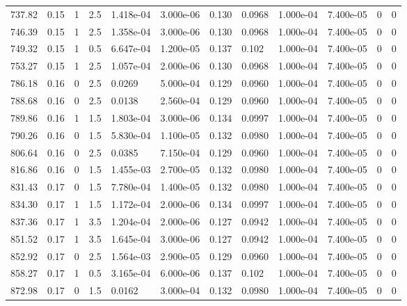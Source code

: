 \documentclass[preview]{standalone}
\begin{document}
{{{\begin{tabular}{L{1.2cm}C{1.2cm} C{0.3cm}C{0.5cm} C{1.4cm}C{1.4cm} C{1.4cm}C{1.4cm} C{1.6cm}C{1.6cm} C{1.6cm}C{1.6cm}}
  737.82  &  0.15  & 1     & 2.5 &  1.418e-04  & 3.000e-06  &  0.130&   0.0968& 1.000e-04 & 7.400e-05   &  0 & 0  \\ 
  746.39  &  0.15  & 1     & 2.5 &  1.358e-04  & 3.000e-06  &  0.130&   0.0968& 1.000e-04 & 7.400e-05   &  0 & 0  \\ 
  749.32  &  0.15  & 1     & 0.5 &  6.647e-04  & 1.200e-05  &  0.137&   0.102& 1.000e-04 & 7.400e-05   &  0 & 0  \\ 
  753.27  &  0.15  & 1     & 2.5 &  1.057e-04  & 2.000e-06  &  0.130&   0.0968& 1.000e-04 & 7.400e-05   &  0 & 0  \\ 
  786.18  &  0.16  & 0     & 2.5 &  0.0269  & 5.000e-04  &  0.129&   0.0960& 1.000e-04 & 7.400e-05   &  0 & 0  \\ 
  788.68  &  0.16  & 0     & 2.5 &  0.0138  & 2.560e-04  &  0.129&   0.0960& 1.000e-04 & 7.400e-05   &  0 & 0  \\ 
  789.86  &  0.16  & 1     & 1.5 &  1.803e-04  & 3.000e-06  &  0.134&   0.0997& 1.000e-04 & 7.400e-05   &  0 & 0  \\ 
  790.26  &  0.16  & 0     & 1.5 &  5.830e-04  & 1.100e-05  &  0.132&   0.0980& 1.000e-04 & 7.400e-05   &  0 & 0  \\ 
  806.64  &  0.16  & 0     & 2.5 &  0.0385  & 7.150e-04  &  0.129&   0.0960& 1.000e-04 & 7.400e-05   &  0 & 0  \\ 
  816.86  &  0.16  & 0     & 1.5 &  1.455e-03  & 2.700e-05  &  0.132&   0.0980& 1.000e-04 & 7.400e-05   &  0 & 0  \\ 
  831.43  &  0.17  & 0     & 1.5 &  7.780e-04  & 1.400e-05  &  0.132&   0.0980& 1.000e-04 & 7.400e-05   &  0 & 0  \\ 
  834.30  &  0.17  & 1     & 1.5 &  1.172e-04  & 2.000e-06  &  0.134&   0.0997& 1.000e-04 & 7.400e-05   &  0 & 0  \\ 
  837.36  &  0.17  & 1     & 3.5 &  1.204e-04  & 2.000e-06  &  0.127&   0.0942& 1.000e-04 & 7.400e-05   &  0 & 0  \\ 
  851.52  &  0.17  & 1     & 3.5 &  1.645e-04  & 3.000e-06  &  0.127&   0.0942& 1.000e-04 & 7.400e-05   &  0 & 0  \\ 
  852.92  &  0.17  & 0     & 2.5 &  1.564e-03  & 2.900e-05  &  0.129&   0.0960& 1.000e-04 & 7.400e-05   &  0 & 0  \\ 
  858.27  &  0.17  & 1     & 0.5 &  3.165e-04  & 6.000e-06  &  0.137&   0.102& 1.000e-04 & 7.400e-05   &  0 & 0  \\ 
  872.98  &  0.17  & 0     & 1.5 &  0.0162  & 3.000e-04  &  0.132&   0.0980& 1.000e-04 & 7.400e-05   &  0 & 0  \\ 

\end{tabular}}}}
\end{document}
